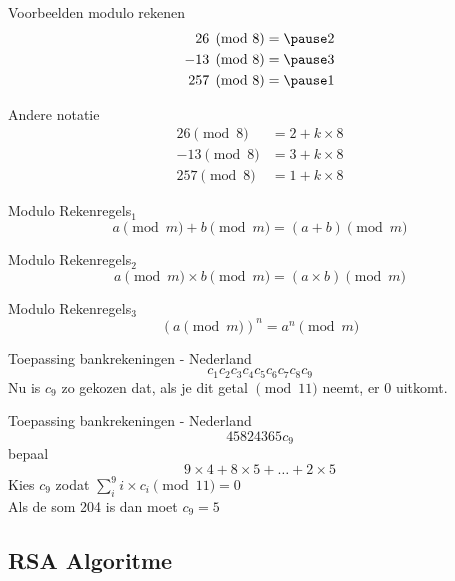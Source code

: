 \documentclass{beamer}
\begin{document}
\begin{frame}{Voorbeelden modulo rekenen}
	\begin{eqnarray}
			26  \pmod{8} &= \pause 2 \\
			-13 \pmod{8} &= \pause 3 \\
			257 \pmod{8} &= \pause 1 
	\end{eqnarray}
\end{frame}

\begin{frame}{Andere notatie}
	\begin{eqnarray}
	26  \pmod{8} &=  2 + k \times 8 \\
	-13 \pmod{8} &= 3 + k \times 8\\
	257 \pmod{8} &=  1 + k \times 8
	\end{eqnarray}
\end{frame}

\begin{frame}{Modulo Rekenregels$_1$}
	\[ a \pmod{m} + b \pmod{m}  =  (a + b)  \pmod{m}\]
\end{frame}

\begin{frame}{Modulo Rekenregels$_2$}
	\[ a \pmod{m} \times b \pmod{m}  =  (a \times b)  \pmod{m}\]
\end{frame}

\begin{frame}{Modulo Rekenregels$_3$}
	\[ (a \pmod{m})^n  =  a^n  \pmod{m}\]
\end{frame}

\begin{frame}{Toepassing bankrekeningen - Nederland}
	\[ c_1c_2c_3c_4c_5c_6c_7c_8c_9\]
	Nu is $c_9$ zo gekozen dat, als je dit getal  $\pmod{11}$ neemt, er 0 uitkomt.
	
\end{frame}

\begin{frame}{Toepassing bankrekeningen - Nederland}
	\[ 45824365c_9\]
	bepaal
	\[ 9 \times 4 + 8 \times 5 + \dots + 2 \times 5 \]
	Kies $c_9$ zodat $\sum_i^9  i \times c_i \pmod{11} = 0$ \\ \pause
	Als de som 204 is dan moet $c_9 = 5$ 
	
\end{frame}

\subsection{RSA Algoritme}
\sectionframe
\end{document}

